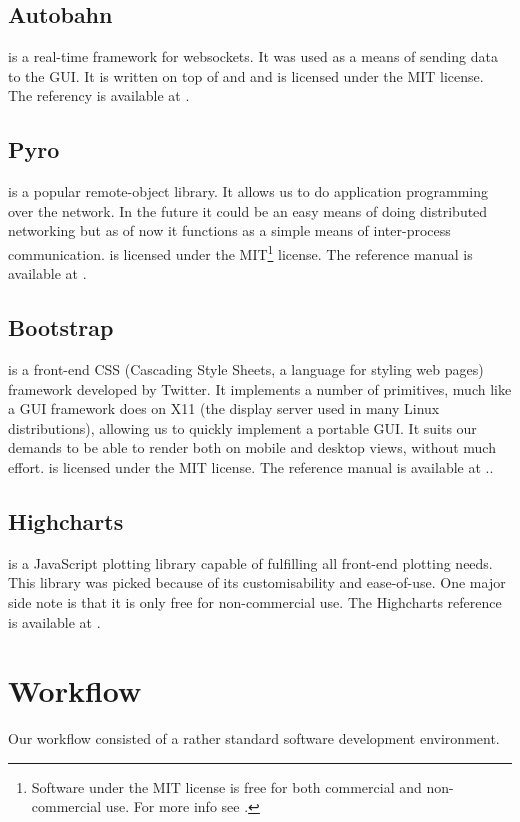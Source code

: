 \documentclass[a4paper, openany, oneside]{memoir}
\begin{document}
\subsection{Autobahn}
\label{sub:autobahn}
 is a real-time framework for websockets. It was used as a means of sending data to the GUI. It is written on top of  and  and is licensed under the MIT license. The referency is available at \cite{autobahn}.

\subsection{Pyro}
\label{sec:pyro}
 is a popular remote-object library. It allows us to do application programming over the network. In the future it could be an easy means of doing distributed networking but as of now it functions as a simple means of inter-process communication.  is licensed under the MIT\footnote{\label{fn:mit}Software under the MIT license is free for both commercial and non-commercial use. For more info see \cite{mitlic}.} license. The reference manual is available at \cite{pyro4}.

\subsection{Bootstrap}
\label{sec:bootstrap}
 is a front-end CSS (Cascading Style Sheets, a language for styling web pages) framework developed by Twitter. It implements a number of primitives, much like a GUI framework does on X11 (the display server used in many Linux distributions), allowing us to quickly implement a portable GUI. It suits our demands to be able to render both on mobile and desktop views, without much effort.  is licensed under the MIT license. The reference manual is available at \cite{bootstrap}..

\subsection{Highcharts}
\label{sec:highcharts}
 is a JavaScript plotting library capable of fulfilling all front-end plotting needs. This library was picked because of its customisability and ease-of-use. One major side note is that it is only free for non-commercial use. The Highcharts reference is available at \cite{highcharts}.

\section{Workflow}
\label{sec:workflow}
Our workflow consisted of a rather standard software development environment.
\end{document}
